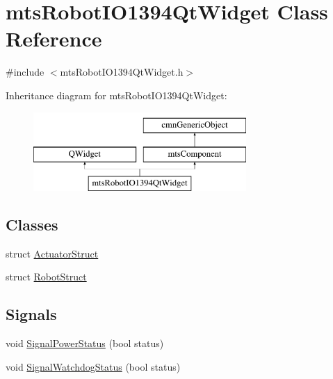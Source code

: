 \hypertarget{classmts_robot_i_o1394_qt_widget}{}\section{mts\+Robot\+I\+O1394\+Qt\+Widget Class Reference}
\label{classmts_robot_i_o1394_qt_widget}


{\ttfamily \#include $<$mts\+Robot\+I\+O1394\+Qt\+Widget.\+h$>$}

Inheritance diagram for mts\+Robot\+I\+O1394\+Qt\+Widget\+:\begin{figure}[H]
\begin{center}
\leavevmode
\includegraphics[height=3.000000cm]{d5/d80/classmts_robot_i_o1394_qt_widget}
\end{center}
\end{figure}
\subsection*{Classes}
\begin{DoxyCompactItemize}
\item 
struct \hyperlink{structmts_robot_i_o1394_qt_widget_1_1_actuator_struct}{Actuator\+Struct}
\item 
struct \hyperlink{structmts_robot_i_o1394_qt_widget_1_1_robot_struct}{Robot\+Struct}
\end{DoxyCompactItemize}
\subsection*{Signals}
\begin{DoxyCompactItemize}
\item 
void \hyperlink{classmts_robot_i_o1394_qt_widget_aa67b0d5f0d3ba1ea6ae470d669181d6e}{Signal\+Power\+Status} (bool status)
\item 
void \hyperlink{classmts_robot_i_o1394_qt_widget_a2653466bf8a851e95fe47930f2b88aab}{Signal\+Watchdog\+Status} (bool status)
\end{DoxyCompactItemize}
